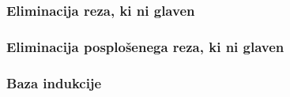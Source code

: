\subsubsection{Eliminacija reza, ki ni glaven} \label{non principal}


\subsubsection{Eliminacija posplošenega reza, ki ni glaven}


\subsubsection{Baza indukcije}

